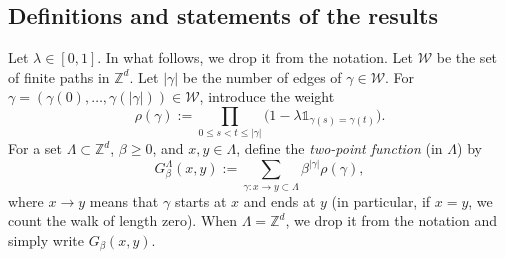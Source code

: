 \documentclass[11pt,a4paper]{article}
\numberwithin{equation}{section}
\theoremstyle{plain}
\theoremstyle{definition}
\begin{document}
\subsection{Definitions and statements of the results}
 Let $\lambda\in [0,1]$. In what follows, we drop it from the notation.  Let $\mathcal{W}$ be the set of finite paths in $\mathbb Z^d$. Let $|\gamma|$ be the number of edges of $\gamma\in\mathcal{W}$. For $\gamma=(\gamma(0),\ldots,\gamma(|\gamma|))\in \mathcal{W}$, introduce the weight\begin{equation}
    \rho(\gamma):=\prod_{0\leq s<t\leq |\gamma|}\big(1-\lambda\mathds{1}_{\gamma(s)=\gamma(t)}\big).
\end{equation}
For a set $\Lambda\subset\mathbb Z^d$, $\beta\geq0$, and $x,y\in\Lambda$, define the {\em two-point function} (in $\Lambda$) by
\begin{equation}
    G_\beta^\Lambda(x,y):=\sum_{\gamma: x\rightarrow y\subset\Lambda}\beta^{|\gamma|}\rho(\gamma),
\end{equation}
where $x\rightarrow y$ means that $\gamma$ starts at $x$ and ends at $y$ (in particular, if $x=y$, we count the walk of length zero). When $\Lambda=\mathbb Z^d$, we drop it from the notation and simply write $G_\beta(x,y)$.
\end{document}
